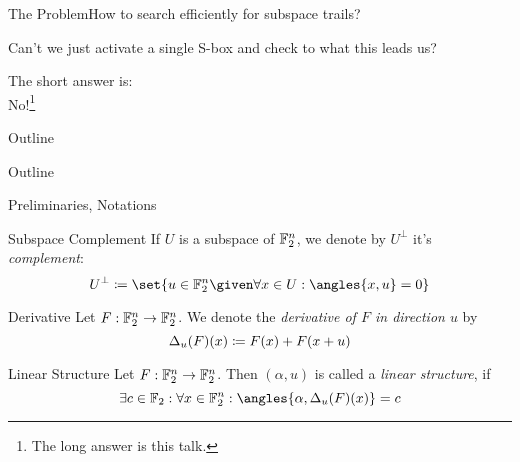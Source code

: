 \begin{frame}{The Problem}{How to search efficiently for subspace trails?}
    \begin{block}{Can't we just activate a single S-box and check to what this leads us?}
        \begin{center}
            The short answer is:\\No!\footnote{The long answer is this talk.}
        \end{center}
    \end{block}
\end{frame}

\begin{frame}{Outline}{}
    \begin{block}{Outline}
        \vspace{0.5em}
        \tableofcontents
    \end{block}
\end{frame}

\begin{frame}{Preliminaries, Notations}
    \begin{block}{Subspace Complement}
        If $U$ is a subspace of $\mathbb{F}_2^n$, we denote by $U^\perp$ it's \emph{complement}:
        \vspace{-0.5em}
        \begin{equation*}
            U^\perp \coloneqq \set{u \in \F_2^n \given \forall x \in U: \angles{x, u} = 0}
            \vspace*{-0.5em}
        \end{equation*}
    \end{block}
    \begin{block}{Derivative}
        Let $F : \mathbb{F}_2^n \to \mathbb{F}_2^n$.
        We denote the \emph{derivative of $F$ in direction $u$} by
        \vspace*{-0.5em}
        \begin{equation*}
            \Delta_u(F)(x) \coloneqq F(x) + F(x + u)
            \vspace*{-0.5em}
        \end{equation*}
    \end{block}
    \begin{block}{Linear Structure}
        Let $F : \mathbb{F}_2^n \to \mathbb{F}_2^n$.
        Then $(\alpha, u)$ is called a \emph{linear structure}, if
        \vspace*{-0.5em}
        \begin{equation*}
            \exists c \in \F_2 : \forall x \in \F_2^n : \angles{\alpha, \Delta_u(F)(x)} = c
            \vspace*{-0.5em}
        \end{equation*}
    \end{block}
\end{frame}

